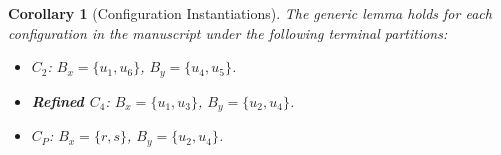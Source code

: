 \documentclass[12pt]{article}
\newtheorem{corollary}[theorem]{Corollary}
\begin{document}
\begin{corollary}[Configuration Instantiations]
The generic lemma holds for each configuration in the manuscript under the following terminal partitions:
\begin{itemize}
    \item \textbf{$C_2$}: $B_x = \{u_1, u_6\}$, $B_y = \{u_4, u_5\}$.
    \item \textbf{Refined $C_4$}: $B_x = \{u_1, u_3\}$, $B_y = \{u_2, u_4\}$.
    \item \textbf{$C_P$}: $B_x = \{r, s\}$, $B_y = \{u_2, u_4\}$.
\end{itemize}
\end{corollary}
\end{document}
